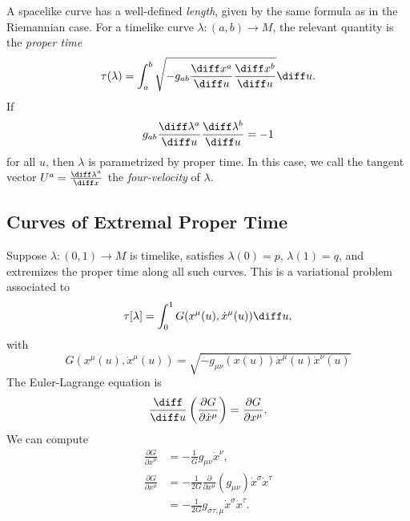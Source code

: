 \documentclass[12pt]{article}
\begin{document}
A spacelike curve has a well-defined \emph{length}, given by the same formula as in the Riemannian case. For a timelike curve $\lambda : (a, b) \to M$, the relevant quantity is the \emph{proper time}
\[
	\tau(\lambda) = \int_{a}^b \sqrt{-g_{ab} \frac{\diff x^a}{\diff u} \frac{\diff x^b}{\diff u}} \diff u.
\]
If
\[
g_{ab} \frac{\diff \lambda^a}{\diff u} \frac{\diff \lambda^b}{\diff u} = -1
\]
for all $u$, then $\lambda$ is parametrized by proper time. In this case, we call the tangent vector $U^a = \frac{\diff \lambda^a}{\diff x}$ the \emph{four-velocity} of $\lambda$.

\subsection{Curves of Extremal Proper Time}%
\label{sub:cept}

Suppose $\lambda : (0, 1) \to M$ is timelike, satisfies $\lambda(0) = p$, $\lambda(1) = q$, and extremizes the proper time along all such curves. This is a variational problem associated to
\[
	\tau[\lambda] = \int_0^1 G(x^\mu(u), \dot x^\mu(u)) \diff u,
\]
with
\[
	G(x^\mu(u), \dot x^\mu(u)) = \sqrt{-g_{\mu\nu}(x(u)) \dot x^\mu(u) \dot x^\nu(u)}
\]
The Euler-Lagrange equation is
\[
\frac{\diff}{\diff u} \left( \frac{\partial G}{\partial \dot x^\mu} \right) = \frac{\partial G}{\partial x^\mu}.
\]
We can compute
\begin{align*}
	\frac{\partial G}{\partial \dot x^\mu} &= - \frac{1}{G} g_{\mu\nu} \dot x^\nu, \\
	\frac{\partial G}{\partial x^\mu} &= - \frac{1}{2G} \frac{\partial}{\partial x^\mu} (g_{\mu\nu}) \dot x^\sigma \dot x^\tau \\
					  &= - \frac{1}{2G} g_{\sigma\tau,\mu} \dot x^\sigma \dot x^\tau.
\end{align*}

\end{document}

